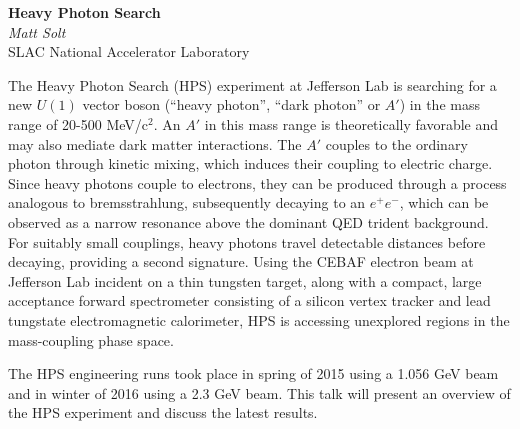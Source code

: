 \documentclass[12pt]{article}
\begin{document}
	\begin{center}
		\textbf{Heavy Photon Search} \\
		\emph{Matt Solt}				            \\
		SLAC National Accelerator Laboratory    	\\
	\end{center}


    The Heavy Photon Search (HPS) experiment at Jefferson Lab is searching 
    for a new $U(1)$ vector boson (``heavy photon'', ``dark photon'' or $A'$)
    in the mass range of 20-500 MeV/c$^{2}$. An $A'$ in this mass range is
    theoretically favorable and may also mediate dark matter interactions.  
    The $A'$ couples to the ordinary photon through kinetic mixing, which 
    induces their coupling to electric charge. Since heavy photons couple to
    electrons, they can be produced through a process analogous to 
    bremsstrahlung, subsequently decaying to an $e^{+}e^{-}$, which can be
    observed as a narrow resonance above the dominant QED trident background.
    For suitably small couplings, heavy photons travel detectable distances
    before decaying, providing a second signature. Using the CEBAF electron
    beam at Jefferson Lab incident on a thin tungsten target, along with a 
    compact, large acceptance forward spectrometer consisting of a silicon
    vertex tracker and lead tungstate electromagnetic calorimeter, HPS is 
    accessing unexplored regions in the mass-coupling phase space. 

    The HPS engineering runs took place in spring of 2015 using a 1.056 GeV beam
    and in winter of 2016 using a 2.3 GeV beam. This talk will present an overview of the HPS 
    experiment and discuss the latest results.
\end{document}
